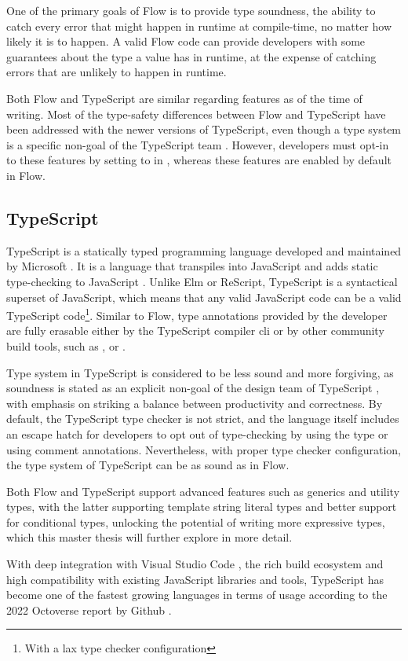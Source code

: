 One of the primary goals of Flow is to provide type soundness, the ability to catch every error that might happen in runtime at compile-time, no matter how likely it is to happen. A valid Flow code can provide developers with some guarantees about the type a value has in runtime, at the expense of catching errors that are unlikely to happen in runtime.

Both Flow and TypeScript are similar regarding features as of the time of writing. Most of the type-safety differences between Flow and TypeScript have been addressed with the newer versions of TypeScript, even though a  type system is a specific non-goal of the TypeScript team \cite{TypeScriptDesignGoals}. However, developers must opt-in to these features by setting  to  in , whereas these features are enabled by default in Flow.

\subsection{TypeScript}

TypeScript is a statically typed programming language developed and maintained by Microsoft \cite{TypeScriptJavaScriptSyntax}. It is a language that transpiles into JavaScript and adds static type-checking to JavaScript \cite{DocumentationTypeScriptJavaScript}. Unlike Elm or ReScript, TypeScript is a syntactical superset of JavaScript, which means that any valid JavaScript code can be a valid TypeScript code\footnote{With a lax type checker configuration}. Similar to Flow, type annotations provided by the developer are fully erasable either by the TypeScript compiler \acrshort{cli} or by other community build tools, such as \cite{BabelBabel2023}, \cite{EsbuildExtremelyFast} or \cite{SWCRustbasedPlatform}.

Type system in TypeScript is considered to be less sound and more forgiving, as soundness is stated as an explicit non-goal of the design team of TypeScript \cite{TypeScriptDesignGoals}, with emphasis on striking a balance between productivity and correctness. By default, the TypeScript type checker is not strict, and the language itself includes an escape hatch for developers to opt out of type-checking by using the  type or using  comment annotations. Nevertheless, with proper type checker configuration, the type system of TypeScript can be as sound as in Flow.

Both Flow and TypeScript support advanced features such as generics and utility types, with the latter supporting template string literal types and better support for conditional types, unlocking the potential of writing more expressive types, which this master thesis will further explore in more detail.

With deep integration with Visual Studio Code \cite{VisualStudioCode}, the rich build ecosystem and high compatibility with existing JavaScript libraries and tools, TypeScript has become one of the fastest growing languages in terms of usage according to the 2022 Octoverse report by Github \cite{Octoverse2022State}.
